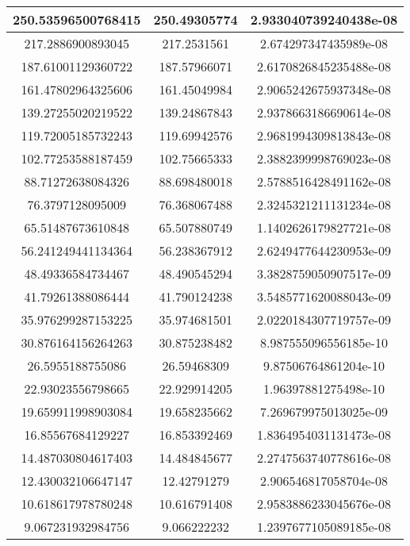 \begin{longtable}[!h]{|c|c|c|}
    \hline
    250.53596500768415 & 250.49305774 & 2.933040739240438e-08\\
    \hline
    217.2886900893045 & 217.2531561 & 2.674297347435989e-08\\
    \hline
    187.61001129360722 & 187.57966071 & 2.6170826845235488e-08\\
    \hline
    161.47802964325606 & 161.45049984 & 2.9065242675937348e-08\\
    \hline
    139.27255020219522 & 139.24867843 & 2.9378663186690614e-08\\
    \hline
    119.72005185732243 & 119.69942576 & 2.9681994309813843e-08\\
    \hline
    102.77253588187459 & 102.75665333 & 2.3882399998769023e-08\\
    \hline
    88.71272638084326 & 88.698480018 & 2.5788516428491162e-08\\
    \hline
    76.3797128095009 & 76.368067488 & 2.3245321211131234e-08\\
    \hline
    65.51487673610848 & 65.507880749 & 1.1402626179827721e-08\\
    \hline
    56.241249441134364 & 56.238367912 & 2.6249477644230953e-09\\
    \hline
    48.49336584734467 & 48.490545294 & 3.3828759050907517e-09\\
    \hline
    41.79261388086444 & 41.790124238 & 3.5485771620088043e-09\\
    \hline
    35.976299287153225 & 35.974681501 & 2.0220184307719757e-09\\
    \hline
    30.876164156264263 & 30.875238482 & 8.987555096556185e-10\\
    \hline
    26.5955188755086 & 26.59468309 & 9.87506764861204e-10\\
    \hline
    22.93023556798665 & 22.929914205 & 1.96397881275498e-10\\
    \hline
    19.659911998903084 & 19.658235662 & 7.269679975013025e-09\\
    \hline
    16.85567684129227 & 16.853392469 & 1.8364954031131473e-08\\
    \hline
    14.487030804617403 & 14.484845677 & 2.2747563740778616e-08\\
    \hline
    12.430032106647147 & 12.42791279 & 2.906546817058704e-08\\
    \hline
    10.618617978780248 & 10.616791408 & 2.9583886233045676e-08\\
    \hline
    9.067231932984756 & 9.066222232 & 1.2397677105089185e-08\\

\end{longtable}
